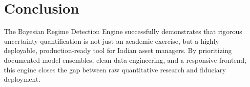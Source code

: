 \documentclass[11pt,a4paper]{article}
\begin{document}
\section{Conclusion}
The Bayesian Regime Detection Engine successfully demonstrates that rigorous uncertainty quantification is not just an academic exercise, but a highly deployable, production-ready tool for Indian asset managers. By prioritizing documented model ensembles, clean data engineering, and a responsive frontend, this engine closes the gap between raw quantitative research and fiduciary deployment.
\end{document}

